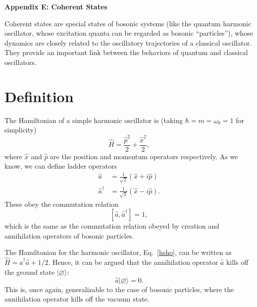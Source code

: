 \documentclass[pra,12pt]{revtex4}
\begin{document}
\begin{center}
{\large \textbf{Appendix E: Coherent States}}
\end{center}

Coherent states are special states of bosonic systems (like the
quantum harmonic oscillator, whose excitation quanta can be regarded
as bosonic ``particles''), whose dynamics are closely related to the
oscillatory trajectories of a classical oscillator.  They provide an
important link between the behaviors of quantum and classical
oscillators.

\section{Definition}

The Hamiltonian of a simple harmonic oscillator is (taking $\hbar = m
= \omega_0 = 1$ for simplicity)
\begin{equation}
  \hat{H} = \frac{\hat{p}^2}{2} + \frac{\hat{x}^2}{2},
  \label{hsho}
\end{equation}
where $\hat{x}$ and $\hat{p}$ are the position and momentum operators
respectively.  As we know, we can define ladder operators
\begin{align}
  \hat{a} &= \frac{1}{\sqrt{2}} \left(\hat{x} + i\hat{p}\right) \\
  \hat{a}^\dagger &= \frac{1}{\sqrt{2}} \left(\hat{x} - i\hat{p}\right).
\end{align}
These obey the commutation relation
\begin{equation}
  \left[\hat{a}, \hat{a}^\dagger\right] = 1,
  \label{commutator}
\end{equation}
which is the same as the commutation relation obeyed by creation and
annihilation operators of bosonic particles.

The Hamiltonian for the harmonic oscillator, Eq.~\eqref{hsho}, can be
written as $\hat{H} = \hat{a}^\dagger\hat{a} + 1/2$.  Hence, it can be
argued that the annihilation operator $\hat{a}$ kills off the ground
state $|\varnothing\rangle$:
\begin{equation}
  \hat{a} |\varnothing\rangle = 0.
  \label{annihilation}
\end{equation}
This is, once again, generalizable to the case of bosonic particles,
where the annihilation operator kills off the vacuum state.
\end{document}
